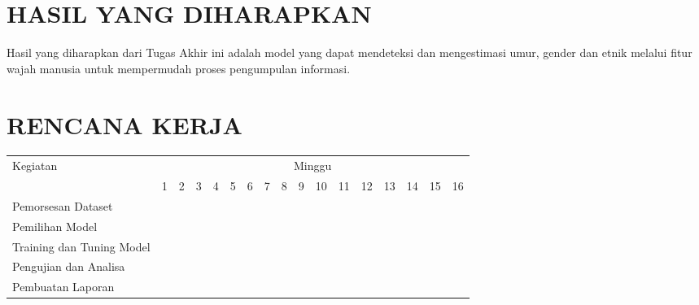 \section{HASIL YANG DIHARAPKAN}

Hasil yang diharapkan dari Tugas Akhir ini adalah model yang dapat mendeteksi dan mengestimasi umur, 
gender dan etnik melalui fitur wajah manusia untuk mempermudah proses pengumpulan informasi.

\section{RENCANA KERJA}

\newcommand{\w}{}
\newcommand{\G}{\cellcolor{gray}}
\begin{table}[h!]
  \begin{tabular}{|p{3.5cm}|c|c|c|c|c|c|c|c|c|c|c|c|c|c|c|c|}

    \hline
    \multirow{2}{*}{Kegiatan} & \multicolumn{16}{|c|}{Minggu} \\
    \cline{2-17} &
    1 & 2 & 3 & 4 & 5 & 6 & 7 & 8 & 9 & 10 & 11 & 12 & 13 & 14 & 15 & 16 \\
    \hline

    Pemorsesan Dataset &
    \G & \G & \w & \w & \w & \w & \w & \w & \w & \w & \w & \w & \w & \w & \w & \w \\
    \hline

    Pemilihan Model &
    \w & \w & \G & \G & \G & \G & \G & \w & \w & \w & \w & \w & \w & \w & \w & \w \\
    \hline

    Training dan Tuning Model &
    \w & \w & \w & \w & \G & \G & \G & \G & \G & \G & \G & \w & \w & \w & \w & \w \\
    \hline

    Pengujian dan Analisa &
    \w & \w & \w & \w & \w & \w & \w & \w & \w & \w & \w & \G & \G & \G & \w & \w \\
    \hline
    
    Pembuatan Laporan &
    \G & \G & \G & \G & \G & \G & \G & \G & \G & \G & \G & \G & \G & \G & \G & \G \\
    \hline

  \end{tabular}
\end{table}